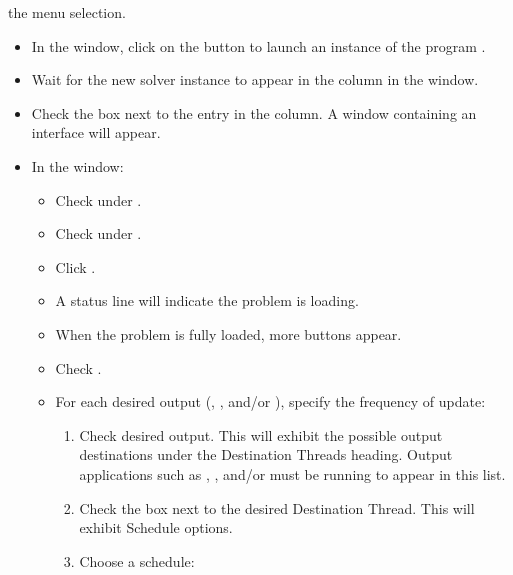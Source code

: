 \begin{list}{}{\setlength{\labelwidth}{0pt}
               \setlength{\leftmargin}{0pt}
               \setlength{\rightmargin}{\leftmargin}
               \setlength{\itemsep}{0pt}}
\begin{description}
\begin{itemize}
            the  menu selection.
    \end{itemize}
    \item[Initialize solver:]\blankspace
    \begin{itemize}
      \item In the  window, click on the 
            button to launch an instance of the program
            .
      \item Wait for the new solver instance to appear in the 
           column in the  window.
      \item Check the box next to the  entry in the
           column.  A window containing an
           interface will appear.
      \item In the  window:
      \begin{itemize}
        \item Check  under .
        \item Check  under .
        \item Click .
        \item A status line will indicate the problem is loading.
        \item When the problem is fully loaded, more buttons appear.
        \item Check .
        \item For each desired output (, , 
          and/or ), specify the frequency of update:
        \begin{enumerate}
          \item Check desired output.  This will exhibit the possible
                output destinations under the Destination Threads
                heading.  Output applications such as ,
                , and/or  must be running
                to appear in this list.
          \item Check the box next to the desired Destination Thread.  
                This will exhibit Schedule options.
          \item Choose a schedule:
          \begin{itemize}

\end{itemize}
\end{enumerate}
\end{itemize}
\end{itemize}
\end{description}
\end{list}
